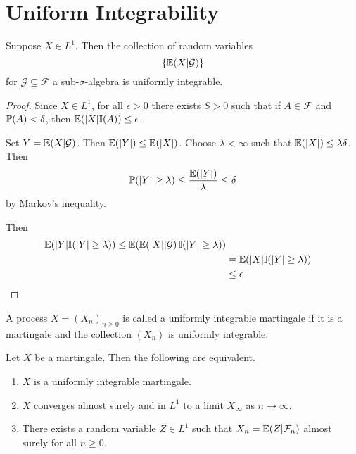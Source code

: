 \section{Uniform Integrability}
\label{sec:unif-integr}

\begin{thm}
  \label{defn:discrete_time_martingales:11}
  Suppose $X \in L^{1}$.  Then the collection of random variables
  \begin{equation}
    \label{eq:35}
    \{ \E{X | \mathcal{G}} \}
  \end{equation} for $\mathcal{G} \subseteq \mathcal{F}$ a
  sub-$\sigma$-algebra is uniformly integrable.
\end{thm}

\begin{proof}
  Since $X \in L^{1}$, for all $\epsilon > 0$ there exists $S > 0$
  such that if $A \in \mathcal{F}$ and $\Prob{A} < \delta$, then
  $\E{|X| \I{A}} \leq \epsilon$.

  Set $Y = \E{X | \mathcal{G}}$.  Then $\E{|Y|} \leq \E{|X|}$.  Choose
  $\lambda < \infty$ such that $\E{|X|} \leq \lambda \delta$.  Then
  \begin{align}
    \label{eq:41}
    \Prob{|Y| \geq \lambda} \leq \frac{\E{|Y|}}{\lambda} \leq \delta
  \end{align} by Markov's inequality.

  Then
  \begin{align}
    \label{eq:42}
    \E{|Y| \I{|Y| \geq \lambda}} \leq \E{\E{|X| | \mathcal{G}} \I{|Y|
        \geq \lambda}} \\
    &= \E{|X| \I{|Y| \geq \lambda}} \\
    &\leq \epsilon
  \end{align}
\end{proof}


\begin{defn}
  \label{defn:discrete_time_martingales:12}
  A process $X = (X_{n})_{n \geq 0}$ is called a uniformly integrable
  martingale if it is a martingale and the collection $(X_{n})$ is
  uniformly integrable.
\end{defn}

\begin{thm}
  \label{defn:discrete_time_martingales:13}
  Let $X$ be a martingale.  Then the following are equivalent.
  \begin{enumerate}
  \item \label{item:5} $X$ is a uniformly integrable martingale.
  \item \label{item:6} $X$ converges almost surely and in $L^{1}$ to a limit
    $X_{\infty}$ as $n \rightarrow \infty$.
  \item \label{item:7} There exists a random variable $Z \in L^{1}$ such that $X_{n}
    = \E{Z | \mathcal{F}_{n}}$ almost surely for all $n \geq 0$.
  \end{enumerate}
\end{thm}

